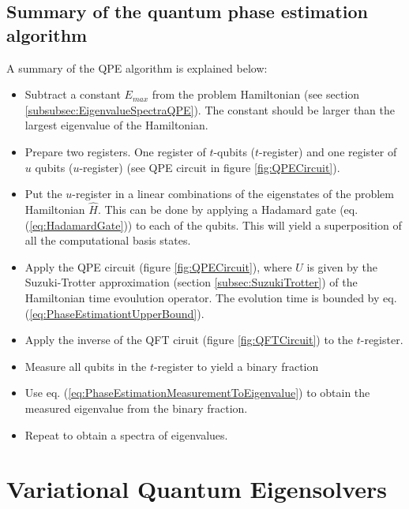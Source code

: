 \subsection{Summary of the quantum phase estimation algorithm}
A summary of the QPE algorithm is explained below:
\begin{itemize}
    \item Subtract a constant $E_{max}$ from the problem Hamiltonian (see section \ref{subsubsec:EigenvalueSpectraQPE}). The constant should be larger than the largest eigenvalue of the Hamiltonian.
    \item Prepare two registers. One register of $t$-qubits ($t$-register) and one register of $u$ qubits ($u$-register) (see QPE circuit in figure \ref{fig:QPECircuit}).
    \item Put the $u$-register in a linear combinations of the eigenstates of the problem Hamiltonian $\hat{H}$. This can be done by applying a Hadamard gate (eq. (\ref{eq:HadamardGate})) to each of the qubits. This will yield a superposition of all the computational basis states.
    \item Apply the QPE circuit (figure \ref{fig:QPECircuit}), where $U$ is given by the Suzuki-Trotter approximation (section \ref{subsec:SuzukiTrotter}) of the Hamiltonian time evoulution operator. The evolution time is bounded by eq. (\ref{eq:PhaseEstimationtUpperBound}).
    \item Apply the inverse of the QFT ciruit (figure \ref{fig:QFTCircuit}) to the $t$-register.
    \item Measure all qubits in the $t$-register to yield a binary fraction
    \item Use eq. (\ref{eq:PhaseEstimationMeasurementToEigenvalue}) to obtain the measured eigenvalue from the binary fraction.
    \item Repeat to obtain a spectra of eigenvalues.
\end{itemize}


\section{Variational Quantum Eigensolvers}
\label{sec:VQE}

